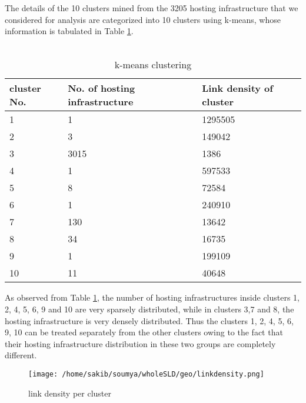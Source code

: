 \noindent The details of the 10 clusters mined from the 3205 hosting infrastructure that we considered for analysis are categorized into 10 clusters using k-means, whose information is tabulated in Table \ref{tab:top10}.\\\

\begin{table}[htb]
\centering
\begin{tabular}[t]{|p{}|p{}||p{}|}
\hline
 cluster No.& No. of hosting infrastructure&Link density of cluster\\
 \hline
 1&1& 1295505\\
 2&3& 149042\\
 3&3015&1386\\
 4&1&597533\\
  5&8&72584\\
   6&1& 240910\\
   7&130&13642\\
    8&34&16735\\
     9&1&199109\\
      10&11&40648\\
 \hline
\end{tabular}
\caption{k-means clustering}
\label{tab:top10}
\end{table}

\noindent As observed from Table \ref{tab:top10}, the number of hosting infrastructures inside clusters 1, 2, 4, 5, 6, 9 and 10 are very sparsely distributed, while in clusters 3,7 and 8, the hosting infrastructure is very densely distributed. Thus the clusters 1, 2, 4, 5, 6, 9, 10  can be treated separately from the other clusters owing to the fact that their hosting infrastructure distribution in these two groups are completely different.\\

\begin{figure}[htb]
  \centering
  \texttt{[image: /home/sakib/soumya/wholeSLD/geo/linkdensity.png]}\\
  \caption{link density per cluster}
  \label{fig:hosting}
\end{figure}

